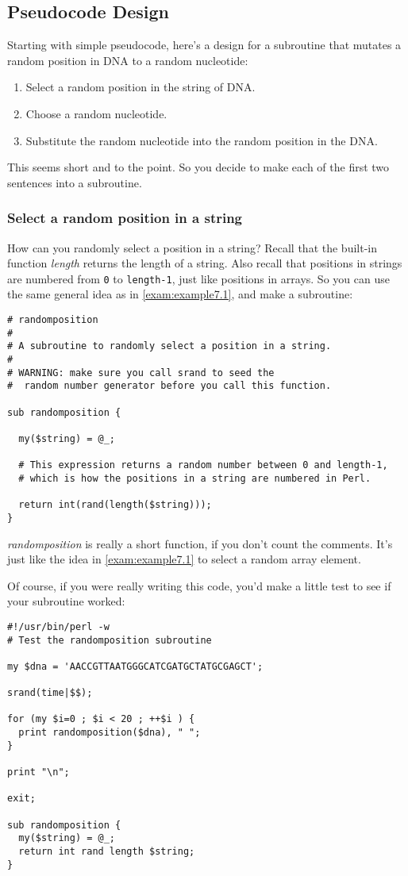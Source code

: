 \subsection{Pseudocode Design}
Starting with simple pseudocode, here's a design for a subroutine that mutates a random position in DNA to a random nucleotide:

\begin{enumerate}
  \item Select a random position in the string of DNA.
  \item Choose a random nucleotide.
  \item Substitute the random nucleotide into the random position in the DNA.
\end{enumerate}

This seems short and to the point. So you decide to make each of the first two sentences into a subroutine. 
\subsubsection{Select a random position in a string}
How can you randomly select a position in a string? Recall that the built-in function \textit{length} returns the length of a string. Also recall that positions in strings are numbered from \verb|0| to \verb|length-1|, just like positions in arrays. So you can use the same general idea as in \autoref{exam:example7.1}, and make a subroutine: 

\begin{lstlisting}
# randomposition
#
# A subroutine to randomly select a position in a string.
#
# WARNING: make sure you call srand to seed the
#  random number generator before you call this function.

sub randomposition {

  my($string) = @_;

  # This expression returns a random number between 0 and length-1,
  # which is how the positions in a string are numbered in Perl.

  return int(rand(length($string)));
}
\end{lstlisting}

\textit{randomposition} is really a short function, if you don't count the comments. It's just like the idea in \autoref{exam:example7.1} to select a random array element.

Of course, if you were really writing this code, you'd make a little test to see if your subroutine worked:

\begin{lstlisting}
#!/usr/bin/perl -w
# Test the randomposition subroutine

my $dna = 'AACCGTTAATGGGCATCGATGCTATGCGAGCT';

srand(time|$$);

for (my $i=0 ; $i < 20 ; ++$i ) {
  print randomposition($dna), " ";
}

print "\n";

exit;

sub randomposition {
  my($string) = @_;
  return int rand length $string;
}
\end{lstlisting}

